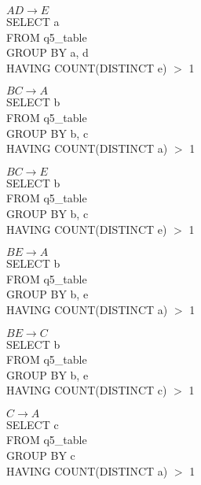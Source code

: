 \documentclass[a4paper,12pt]{article}
\begin{document}
\begin{tcolorbox}
$AD \to E$ \\

SELECT a\\
FROM q5\_table\\ 
GROUP BY a, d\\
HAVING COUNT(DISTINCT e) $>$ 1 \\
\end{tcolorbox}

\begin{tcolorbox}
$BC \to A$ \\

SELECT b\\
FROM q5\_table\\ 
GROUP BY b, c\\
HAVING COUNT(DISTINCT a) $>$ 1 \\
\end{tcolorbox}

\begin{tcolorbox}
$BC \to E$ \\

SELECT b\\
FROM q5\_table\\ 
GROUP BY b, c\\
HAVING COUNT(DISTINCT e) $>$ 1 \\
\end{tcolorbox}

\begin{tcolorbox}
$BE \to A$ \\

SELECT b\\
FROM q5\_table\\ 
GROUP BY b, e\\
HAVING COUNT(DISTINCT a) $>$ 1 \\
\end{tcolorbox}

\begin{tcolorbox}
$BE \to C$ \\

SELECT b\\
FROM q5\_table\\ 
GROUP BY b, e\\
HAVING COUNT(DISTINCT c) $>$ 1 \\
\end{tcolorbox}

\begin{tcolorbox}
$C \to A$ \\

SELECT c\\
FROM q5\_table\\ 
GROUP BY c\\
HAVING COUNT(DISTINCT a) $>$ 1 \\
\end{tcolorbox}
\end{document}
